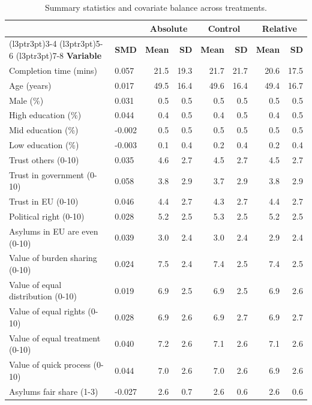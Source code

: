 \documentclass[
  12pt,
  a4paper,
]{article}
\begin{document}
\begin{table}
\centering
\caption{\label{tab:summary}Summary statistics and covariate balance across treatments.}
\centering
\begin{tabular}[t]{llrrrrrr}
\toprule
\multicolumn{2}{c}{\textbf{ }} & \multicolumn{2}{c}{\textbf{Absolute}} & \multicolumn{2}{c}{\textbf{Control}} & \multicolumn{2}{c}{\textbf{Relative}} \\
\cmidrule(l{3pt}r{3pt}){3-4} \cmidrule(l{3pt}r{3pt}){5-6} \cmidrule(l{3pt}r{3pt}){7-8}
\textbf{Variable} & \textbf{SMD} & \textbf{Mean} & \textbf{SD} & \textbf{Mean} & \textbf{SD} & \textbf{Mean} & \textbf{SD}\\
\midrule
Completion time (mins) & 0.057 & 21.5 & 19.3 & 21.7 & 21.7 & 20.6 & 17.5\\
Age (years) & 0.017 & 49.5 & 16.4 & 49.6 & 16.4 & 49.4 & 16.7\\
Male (\%) & 0.031 & 0.5 & 0.5 & 0.5 & 0.5 & 0.5 & 0.5\\
High education (\%) & 0.044 & 0.4 & 0.5 & 0.4 & 0.5 & 0.4 & 0.5\\
Mid education (\%) & -0.002 & 0.5 & 0.5 & 0.5 & 0.5 & 0.5 & 0.5\\
\addlinespace
Low education (\%) & -0.003 & 0.1 & 0.4 & 0.2 & 0.4 & 0.2 & 0.4\\
Trust others (0-10) & 0.035 & 4.6 & 2.7 & 4.5 & 2.7 & 4.5 & 2.7\\
Trust in government (0-10) & 0.058 & 3.8 & 2.9 & 3.7 & 2.9 & 3.8 & 2.9\\
Trust in EU (0-10) & 0.046 & 4.4 & 2.7 & 4.3 & 2.7 & 4.4 & 2.7\\
Political right (0-10) & 0.028 & 5.2 & 2.5 & 5.3 & 2.5 & 5.2 & 2.5\\
\addlinespace
Asylums in EU are even (0-10) & 0.039 & 3.0 & 2.4 & 3.0 & 2.4 & 2.9 & 2.4\\
Value of burden sharing (0-10) & 0.024 & 7.5 & 2.4 & 7.4 & 2.5 & 7.4 & 2.5\\
Value of equal distribution (0-10) & 0.019 & 6.9 & 2.5 & 6.9 & 2.5 & 6.9 & 2.6\\
Value of equal rights (0-10) & 0.028 & 6.9 & 2.6 & 6.9 & 2.7 & 6.9 & 2.7\\
Value of equal treatment (0-10) & 0.040 & 7.2 & 2.6 & 7.1 & 2.6 & 7.1 & 2.6\\
\addlinespace
Value of quick process (0-10) & 0.044 & 7.0 & 2.6 & 7.0 & 2.6 & 6.9 & 2.6\\
Asylums fair share (1-3) & -0.027 & 2.6 & 0.7 & 2.6 & 0.6 & 2.6 & 0.6\\

\end{tabular}
\end{table}
\end{document}
